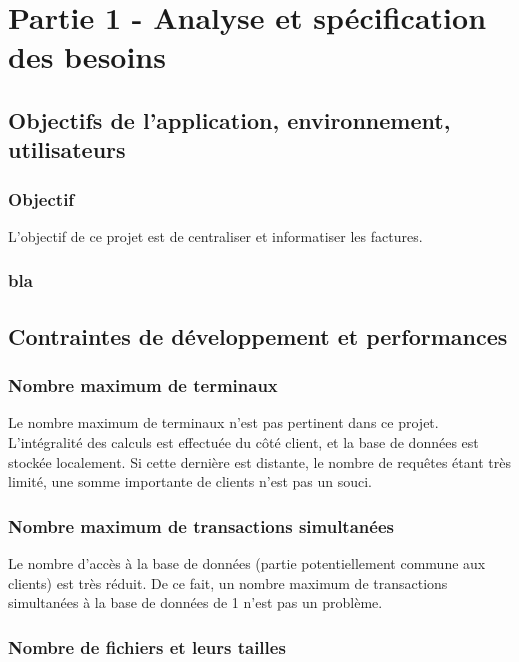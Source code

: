 \chapter{Partie 1 - Analyse et spécification des besoins}

\section{Objectifs de l'application, environnement, utilisateurs}

\subsection{Objectif}
L'objectif de ce projet est de centraliser et informatiser les factures.

\subsection{bla}

\section{Contraintes de développement et performances}

\subsection{Nombre maximum de terminaux}

Le nombre maximum de terminaux n’est pas pertinent dans ce projet. L’intégralité des calculs est effectuée du côté client, et la base de données est stockée localement. Si cette dernière est distante, le nombre de requêtes étant très limité, une somme importante de clients n’est pas un souci.

\subsection{Nombre maximum de transactions simultanées}

Le nombre d’accès à la base de données (partie potentiellement commune aux clients) est très réduit. De ce fait, un nombre maximum de transactions simultanées à la base de données de 1 n’est pas un problème.

\subsection{Nombre de fichiers et leurs tailles}

